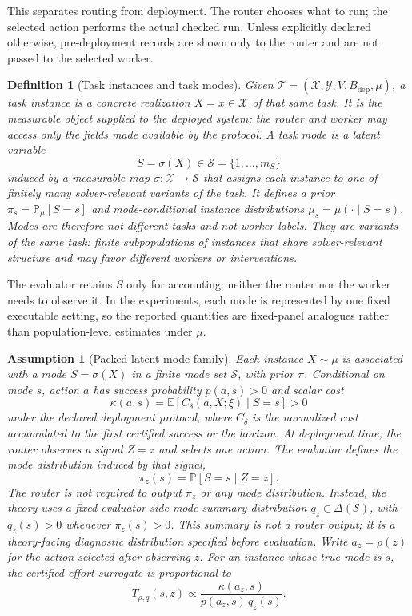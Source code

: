 \documentclass{article}
\newtheorem{assumption}{Assumption}
\newtheorem{definition}{Definition}
\newcommand{\cS}{\mathcal{S}}
\newcommand{\cT}{\mathcal{T}}
\newcommand{\cX}{\mathcal{X}}
\newcommand{\cY}{\mathcal{Y}}
\newcommand{\E}{\mathbb{E}}
\newcommand{\Prb}{\mathbb{P}}
\begin{document}
This separates routing from deployment.
The router chooses what to run; the selected action performs the actual checked run.
Unless explicitly declared otherwise, pre-deployment records are shown only to the router and are not passed to the selected worker.

\begin{definition}[Task instances and task modes]
\label{def:modes}
Given $\cT=(\cX,\cY,V,B_{\mathrm{dep}},\mu)$, a task instance is a concrete realization $X=x\in\cX$ of that same task.
It is the measurable object supplied to the deployed system; the router and worker may access only the fields made available by the protocol.
A task mode is a latent variable
\[
S=\sigma(X)\in\cS=\{1,\ldots,m_S\}
\]
induced by a measurable map $\sigma:\cX\to\cS$ that assigns each instance to one of finitely many solver-relevant variants of the task.
It defines a prior $\pi_s=\Prb_\mu[S=s]$ and mode-conditional instance distributions $\mu_s=\mu(\cdot\mid S=s)$.
Modes are therefore not different tasks and not worker labels.
They are variants of the same task: finite subpopulations of instances that share solver-relevant structure and may favor different workers or interventions.
\end{definition}


The evaluator retains \(S\) only for accounting: neither the router nor the worker needs to observe it.
In the experiments, each mode is represented by one fixed executable setting, so the reported quantities are fixed-panel analogues rather than population-level estimates under \(\mu\).

\begin{assumption}[Packed latent-mode family]
\label{ass:packed}
Each instance $X\sim\mu$ is associated with a mode $S=\sigma(X)$ in a finite mode set $\cS$, with prior $\pi$.
Conditional on mode $s$, action $a$ has success probability $p(a,s)>0$ and scalar cost
\[
\kappa(a,s)=\E[C_\delta(a,X;\xi)\mid S=s]>0
\]
under the declared deployment protocol, where $C_\delta$ is the normalized cost accumulated to the first certified success or the horizon.
At deployment time, the router observes a signal $Z=z$ and selects one action.
The evaluator defines the mode distribution induced by that signal,
\[
\pi_z(s)=\Prb[S=s\mid Z=z].
\]
The router is not required to output $\pi_z$ or any mode distribution.
Instead, the theory uses a fixed evaluator-side mode-summary distribution $q_z\in\Delta(\cS)$, with $q_z(s)>0$ whenever $\pi_z(s)>0$.
This summary is not a router output; it is a theory-facing diagnostic distribution specified before evaluation.
Write $a_z=\rho(z)$ for the action selected after observing $z$.
For an instance whose true mode is $s$, the certified effort surrogate is proportional to
\begin{equation}
  T_{\rho,q}(s,z) \propto \frac{\kappa(a_z,s)}{p(a_z,s)\,q_z(s)} .
  \label{eq:effort-surrogate}
\end{equation}
\end{assumption}
\end{document}
